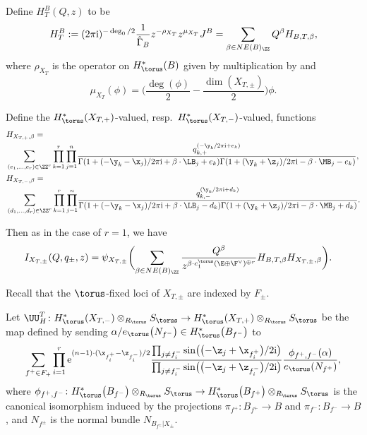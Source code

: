 Define $H^B_T(Q ,z)$ to be
\begin{align*} H^B_T := (2 \pi {\rm i})^{-\deg_0/2}\frac{1}{\hat \Gamma_B} z^{- \rho_{X_T}} z^{\mu_{X_T}} J^B
 =
\sum_{\beta \in NE(B)_\ZZ} Q^\beta H_{B, T, \beta},\end{align*}
where $\rho_{X_T}$ is the operator on $H^*_\torus(B)$ given by multiplication by  and
\[
\mu_{X_T}(\phi) = \biggl( \frac{\deg(\phi)}{2} -\frac{ \dim(X_{T, \pm})}{2} \biggr) \phi.
\]

Define the $H^*_\torus(X_{T,+})$-valued, resp.\ $H^*_\torus(X_{T,-})$-valued, functions
\begin{align*}
&H_{X_{T, +}, \beta} =\\ &
\sum_{(e_1, \dots, e_r) \in \ZZ^r} \prod_{k=1}^r\prod_{j=1}^n \!\frac{q_{k, +}^{(-\y_k/2 \pi {\rm i} + e_k)}}
 {\Gamma(1+(-\y_k-\x_j)/2 \pi {\rm i}+\beta\cdot \LB_j+e_k)\Gamma(1+(\y_k+\z_j)/2 \pi {\rm i}-\beta\cdot \MB_j-e_k)},
\\
&H_{X_{T, -}, \beta} = \\ & \sum_{(d_1, \dots, d_r) \in \ZZ^r} \prod_{k=1}^r \prod_{j=1}^n\!\frac{q_{k, -}^{(\y_k/2 \pi {\rm i} + d_k)} }{\Gamma(1+(-\y_k-\x_j)/2 \pi {\rm i}+\beta\cdot \LB_j - d_k)\Gamma(1+(\y_k+\z_j)/2 \pi {\rm i}-\beta\cdot \MB_j + d_k)}.
\end{align*}

Then as in the case of $r=1$, we have
\begin{align*}%
I_{X_{T, \pm}}(Q, q_\pm, z) &{}= \psi_{X_{T,\pm}} \biggl( \sum_{\beta \in NE(B)_\ZZ} \frac{Q^\beta}{z^{\beta \cdot c_1^\torus(\E \oplus \F^\vee)^{\oplus r}}} H_{B, T, \beta} H_{X_{T, \pm}, \beta} \biggr).
\end{align*}



Recall that the $\torus$-fixed loci of $X_{T, \pm}$ are indexed by $F_\pm$.

Let $\UU_H^T\colon H^*_\torus(X_{T,-})\otimes_{R_\torus} S_\torus \to H^*_\torus(X_{T,+})\otimes_{R_\torus} S_\torus$ be the map defined by sending
$\alpha/e_\torus\bigl(N_{f^-}\bigr) \in H^*_\torus\bigl(B_{f^-}\bigr)$ to
\[
\sum_{f^+ \in F_+} \prod_{i=1}^r {\rm e}^{ (n-1)\cdot ( \x_{f^+_i}- \z_{f^-_i})/2 }\frac{ \prod_{j\neq {f^-_i}} \sin\bigl( \bigl(-\z_j+\x_{f^+_i}\bigr)/2 {\rm i}\bigr) }{\prod_{j \neq {f^-_i}}\sin\bigl(\bigl(-\z_j + \z_{f^-_i}\bigr)/2 {\rm i}\bigr)} \frac{\phi_{f^+, f^-}(\alpha)}{e_\torus(N_{f^+})},
\]
where $\phi_{f^+, f^-}\colon H^*_\torus\bigl(B_{f^-}\bigr)\otimes_{R_\torus} S_\torus \to H^*_\torus\bigl(B_{f^+}\bigr)\otimes_{R_\torus} S_\torus$ is the canonical isomorphism induced by the projections $\pi_{f^+}\colon B_{f^+} \to B$ and $\pi_{f^-}\colon B_{f^-} \to B$, and $N_{f^\pm}$ is the normal bundle $N_{B_{f^\pm}|X_\pm}$.

